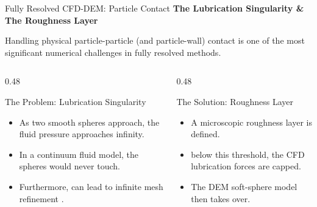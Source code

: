 \begin{frame}{Fully Resolved CFD-DEM: Particle Contact}
    \textbf{The Lubrication Singularity \& The Roughness Layer}
    \vspace{0.3cm}
    
    Handling physical particle-particle (and particle-wall) contact is one of the most significant numerical challenges in fully resolved methods.
    
    \vspace{0.2cm}
    \begin{columns}[T]
        \begin{column}{0.48\textwidth}
            \begin{block}{The Problem: Lubrication Singularity}
                \begin{itemize}
                    \item As two smooth spheres approach, the fluid pressure  approaches infinity.
                    \item In a  continuum fluid model, the spheres would never  touch.
                    \item Furthermore,  can lead to infinite mesh refinement .
                \end{itemize}
            \end{block}
        \end{column}
        
        \begin{column}{0.48\textwidth}
            \begin{block}{The Solution: Roughness Layer}
                \begin{itemize}
                    \item A microscopic roughness layer is defined.
                    \item {}below this threshold, the CFD lubrication forces are capped.
                    \item The DEM soft-sphere model then takes over.
                \end{itemize}
            \end{block}
        \end{column}
    \end{columns}
\end{frame}

